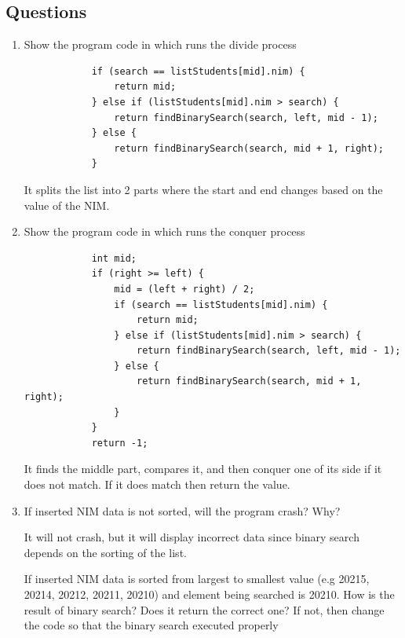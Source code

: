 \documentclass[12pt,titlepage]{article}
\begin{document}
\subsection{Questions}
\begin{enumerate}
    \item {
        Show the program code in which runs the divide process

        \begin{verbatim}
            if (search == listStudents[mid].nim) {
                return mid;
            } else if (listStudents[mid].nim > search) {
                return findBinarySearch(search, left, mid - 1);
            } else {
                return findBinarySearch(search, mid + 1, right);
            }
        \end{verbatim}

        It splits the list into 2 parts where the start and end changes based on the value of the NIM.
    }
    \pagebreak
    \item {
        Show the program code in which runs the conquer process

        \begin{verbatim}
            int mid;
            if (right >= left) {
                mid = (left + right) / 2;
                if (search == listStudents[mid].nim) {
                    return mid;
                } else if (listStudents[mid].nim > search) {
                    return findBinarySearch(search, left, mid - 1);
                } else {
                    return findBinarySearch(search, mid + 1, right);
                }
            }
            return -1;
        \end{verbatim}

        It finds the middle part, compares it, and then conquer one of its side if it does not match. If it does match
        then return the value.
    }
    \item {
        If inserted NIM data is not sorted, will the program crash? Why?
        
        It will not crash, but it will display incorrect data since binary search depends on the sorting of the list.
        
        If inserted NIM data is sorted from largest to smallest value (e.g 20215, 20214, 20212, 20211, 20210) and element being searched is 20210.
        How is the result of binary search? Does it return the correct one? If not, then change the code so that the binary search executed properly

}
\end{enumerate}
\end{document}
